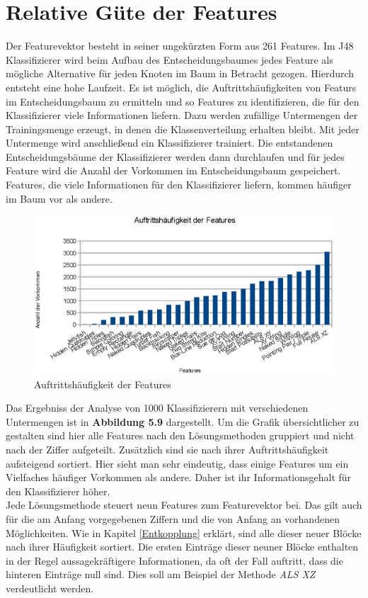 \newpage
\section{Relative Güte der Features}
Der Featurevektor besteht in seiner ungekürzten Form aus 261 Features. Im J48 Klassifizierer wird beim Aufbau des Entscheidungsbaumes jedes Feature als mögliche Alternative für jeden Knoten im Baum in Betracht gezogen. Hierdurch entsteht eine hohe Laufzeit. Es ist möglich, die Auftrittshäufigkeiten von Featurs im Entscheidungsbaum zu ermitteln und so Features zu identifizieren, die für den Klassifizierer viele Informationen liefern. Dazu werden zufällige Untermengen der Trainingsmenge erzeugt, in denen die Klassenverteilung erhalten bleibt. Mit jeder Untermenge wird anschließend ein Klassifizierer trainiert. Die entstandenen Entscheidungsbäume der Klassifizierer werden dann durchlaufen und für jedes Feature wird die Anzahl der Vorkommen im Entscheidungsbaum gespeichert. Features, die viele Informationen für den Klassifizierer liefern, kommen häufiger im Baum vor als andere.

\begin{figure}[H]
    \includegraphics[width=\textwidth,height=\textheight,keepaspectratio]{./img/features.eps}
    \caption{Auftrittshäufigkeit der Features}
\end{figure}

\noindent Das Ergebniss der Analyse von 1000 Klassifizierern mit verschiedenen Untermengen ist in \textbf{Abbildung 5.9} dargestellt. Um die Grafik übersichtlicher zu gestalten sind hier alle Features nach den Lösungsmethoden gruppiert und nicht nach der Ziffer aufgeteilt. Zusätzlich sind sie nach ihrer Auftrittshäufigkeit aufsteigend sortiert. Hier sieht man sehr eindeutig, dass einige Features um ein Vielfaches häufiger Vorkommen als andere. Daher ist ihr Informationsgehalt für den Klassifizierer höher.\\
Jede Lösungsmethode steuert neun Features zum Featurevektor bei. Das gilt auch für die am Anfang vorgegebenen Ziffern und die von Anfang an vorhandenen Möglichkeiten. Wie in Kapitel \ref{Entkopplung} erklärt, sind alle dieser neuer Blöcke nach ihrer Häufigkeit sortiert. Die ersten Einträge dieser neuner Blöcke enthalten in der Regel aussagekräftigere Informationen, da oft der Fall auftritt, dass die hinteren Einträge null sind. Dies soll am Beispiel der Methode \textit{ALS XZ} verdeutlicht werden.

